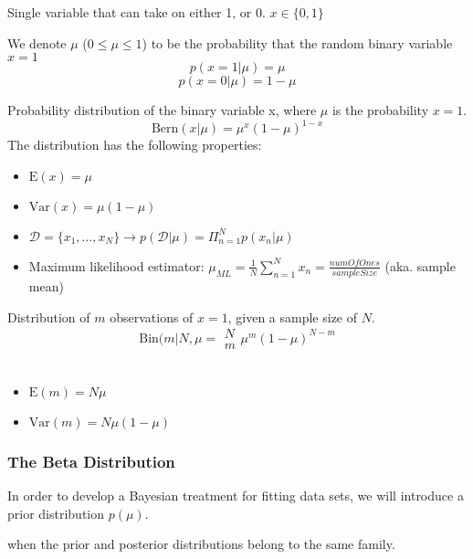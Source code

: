 \begin{defn}
	Single variable that can take on either 1, or 0. $x\in \{0, 1\}$
\end{defn}

We denote $\mu$ ($0\leq\mu\leq 1$) to be the probability that the random binary variable $x=1$
	$$p(x=1|\mu)=\mu$$
	$$p(x=0|\mu)=1-\mu$$

\begin{defn}
	Probability distribution of the binary variable x, where $\mu$ is the probability $x=1$.
	$$\text{Bern}(x|\mu)=\mu^x(1-\mu)^{1-x}$$
	The distribution has the following properties:
	\begin{itemize}
		\item $\text{E}(x)=\mu$
		\item $\text{Var}(x)=\mu (1-\mu)$
		\item $\mathcal{D}=\{x_1,\ldots ,x_N\} \to p(\mathcal{D} | \mu )=\Pi_{n=1}^{N}p(x_n|\mu)$
		\item Maximum likelihood estimator: $\mu_{ML}=\frac{1}{N}\sum_{n=1}^{N}x_n=\frac{numOfOnes}{sampleSize}$ (aka. sample mean)
	\end{itemize}
\end{defn}

\begin{defn}
	Distribution of $m$ observations of $x=1$, given a sample size of $N$. 
	$$\text{Bin} (m|N,\mu={\substack{N\\m}}\mu^m (1-\mu )^{N-m}$$\
	\begin{itemize}
		\item $\text{E}(m)=N\mu$
		\item $\text{Var}(m)=N\mu (1-\mu )$
	\end{itemize}
\end{defn}

\subsubsection{The Beta Distribution}
In order to develop a Bayesian treatment for fitting data sets, we will introduce a prior distribution $p(\mu)$.

\begin{defn}[Conjugacy] when the prior and posterior distributions belong to the same family. \end{defn}

